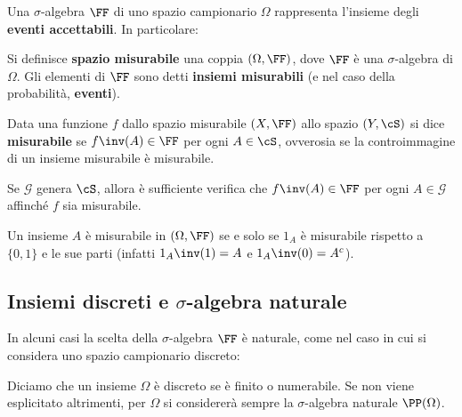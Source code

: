 \begin{multicols*}{2}
    Una $\sigma$-algebra $\FF$ di uno spazio campionario $\Omega$ rappresenta l'insieme degli
    \textbf{eventi accettabili}. In particolare:

    \begin{definition}
        Si definisce \textbf{spazio misurabile} una coppia
        $(\Omega, \FF)$, dove $\FF$ è una $\sigma$-algebra
        di $\Omega$. Gli elementi di $\FF$ sono detti
        \textbf{insiemi misurabili} (e nel caso della probabilità,
        \textbf{eventi}).
    \end{definition}

    \begin{definition}
        Data una funzione $f$ dallo spazio misurabile $(X, \FF)$ allo spazio
        $(Y, \cS)$ si dice \textbf{misurabile} se $f\inv(A) \in \FF$ per ogni
        $A \in \cS$, ovverosia se la controimmagine di un insieme misurabile è
        misurabile.
    \end{definition}

    \begin{remark}
        Se $\mathcal{G}$ genera $\cS$, allora è sufficiente verifica che
        $f\inv(A) \in \FF$ per ogni $A \in \mathcal{G}$ affinché
        $f$ sia misurabile.
    \end{remark}

    \begin{remark}
        Un insieme $A$ è misurabile in $(\Omega, \FF)$ se e solo se
        $1_A$ è misurabile rispetto a $\{0,1\}$ e le sue parti (infatti
        $1_A\inv(1) = A$ e $1_A\inv(0) = A^c$).
    \end{remark}

    \subsection{Insiemi discreti e \texorpdfstring{$\sigma$}{σ}-algebra naturale}

    In alcuni casi la scelta della $\sigma$-algebra $\FF$ è
    naturale, come nel caso in cui si considera uno spazio
    campionario discreto:

    \begin{definition}
        Diciamo che un insieme $\Omega$ è discreto se è finito o numerabile.
        Se non viene esplicitato altrimenti, per $\Omega$ si considererà
        sempre la $\sigma$-algebra naturale $\PP(\Omega)$.
    \end{definition}


\end{multicols*}
